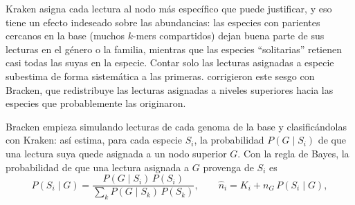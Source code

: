 Kraken asigna cada lectura al nodo más específico que puede justificar, y eso tiene un efecto indeseado sobre las abundancias: las especies con parientes cercanos en la base (muchos $k$-mers compartidos) dejan buena parte de sus lecturas en el género o la familia, mientras que las especies ``solitarias'' retienen casi todas las suyas en la especie. Contar solo las lecturas asignadas a especie subestima de forma sistemática a las primeras. \textcite{c14-lu2017} corrigieron este sesgo con Bracken, que redistribuye las lecturas asignadas a niveles superiores hacia las especies que probablemente las originaron.

Bracken empieza simulando lecturas de cada genoma de la base y clasificándolas con Kraken: así estima, para cada especie $S_i$, la probabilidad $P(G\mid S_i)$ de que una lectura suya quede asignada a un nodo superior $G$. Con la regla de Bayes, la probabilidad de que una lectura asignada a $G$ provenga de $S_i$ es
\begin{equation}\label{eq:14-bracken}
P(S_i \mid G) = \frac{P(G \mid S_i)\, P(S_i)}{\sum_k P(G\mid S_k)\, P(S_k)}, \qquad
\hat{n}_i = K_i + n_G\, P(S_i\mid G),
\end{equation}

\begin{simbolos}
\end{simbolos}

